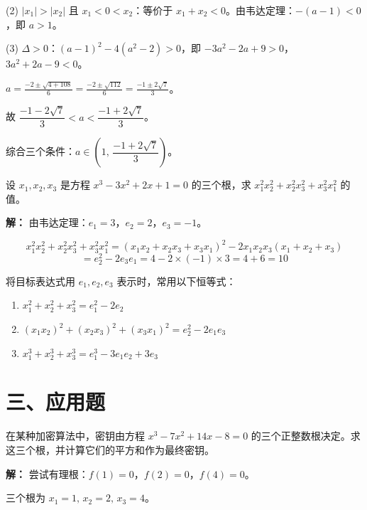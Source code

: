 \documentclass[12pt, a4paper]{ctexart}
\begin{document}
(2) $|x_1| > |x_2|$ 且 $x_1 < 0 < x_2$：等价于 $x_1 + x_2 < 0$。由韦达定理：$-(a-1) < 0$，即 $a > 1$。

(3) $\Delta > 0$：$(a-1)^2 - 4(a^2-2) > 0$，即 $-3a^2 - 2a + 9 > 0$，$3a^2 + 2a - 9 < 0$。

$a = \frac{-2 \pm \sqrt{4+108}}{6} = \frac{-2 \pm \sqrt{112}}{6} = \frac{-1 \pm 2\sqrt{7}}{3}$。

故 $\dfrac{-1-2\sqrt{7}}{3} < a < \dfrac{-1+2\sqrt{7}}{3}$。

综合三个条件：$a \in \left(1,\, \dfrac{-1+2\sqrt{7}}{3}\right)$。

\begin{examplebox}[【例题12】对称多项式综合]
设 $x_1, x_2, x_3$ 是方程 $x^3 - 3x^2 + 2x + 1 = 0$ 的三个根，求 $x_1^2 x_2^2 + x_2^2 x_3^2 + x_3^2 x_1^2$ 的值。
\end{examplebox}

\textbf{解：} 由韦达定理：$e_1 = 3$，$e_2 = 2$，$e_3 = -1$。

\[
x_1^2 x_2^2 + x_2^2 x_3^2 + x_3^2 x_1^2 = (x_1 x_2 + x_2 x_3 + x_3 x_1)^2 - 2x_1 x_2 x_3(x_1+x_2+x_3)
\]
\[
= e_2^2 - 2e_3 e_1 = 4 - 2 \times (-1) \times 3 = 4 + 6 = 10
\]

\begin{tipbox}[对称多项式化简技巧]
将目标表达式用 $e_1, e_2, e_3$ 表示时，常用以下恒等式：
\begin{enumerate}[label=(\arabic*)]
\item $x_1^2+x_2^2+x_3^2 = e_1^2-2e_2$
\item $(x_1x_2)^2+(x_2x_3)^2+(x_3x_1)^2 = e_2^2-2e_1e_3$
\item $x_1^3+x_2^3+x_3^3 = e_1^3-3e_1e_2+3e_3$
\end{enumerate}
\end{tipbox}

\section*{\textcolor{apppurple}{三、应用题}}

\begin{appbox}[【应用1】密码学中的多项式求根]
在某种加密算法中，密钥由方程 $x^3 - 7x^2 + 14x - 8 = 0$ 的三个正整数根决定。求这三个根，并计算它们的平方和作为最终密钥。
\end{appbox}

\textbf{解：} 尝试有理根：$f(1)=0$，$f(2)=0$，$f(4)=0$。

三个根为 $x_1=1,\, x_2=2,\, x_3=4$。
\end{document}
